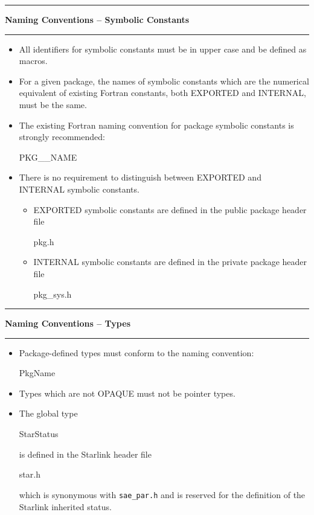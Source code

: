 \documentclass[twoside,11pt,nolof,noabs]{starlink}
\newcounter{sruleno}
\newcommand{\srule}[1]{
    \addtocounter{sruleno}{1}
    \goodbreak
    \rule{\textwidth}{0.3mm}
    \textbf{#1} \scpushright{\textbf{\thesruleno}}
    \rule{\textwidth}{0.1mm}
}
\begin{document}
\srule{Naming Conventions -- Symbolic Constants}
\begin{itemize}
\item All identifiers for symbolic constants must be in upper case and be
defined as macros.
\item For a given package, the names of symbolic constants which are the
numerical equivalent of existing Fortran constants, both EXPORTED and
INTERNAL, must be the same.
\item The existing Fortran naming convention for package symbolic constants
is strongly recommended:
\begin{terminalv}
      PKG__NAME
\end{terminalv}
\item There is no requirement to distinguish between EXPORTED and INTERNAL
symbolic constants.
\begin{itemize}
\item EXPORTED symbolic constants are defined in the public package header
file
\begin{terminalv}
      pkg.h
\end{terminalv}
\item INTERNAL symbolic constants are defined in the private package header
file
\begin{terminalv}
      pkg_sys.h
\end{terminalv}
\end{itemize}
\end{itemize}

\srule{Naming Conventions -- Types}
\begin{itemize}
\item Package-defined types must conform to the naming convention:
\begin{terminalv}
      PkgName
\end{terminalv}
\item Types which are not OPAQUE must not be pointer types.
\item The global type
\begin{terminalv}
      StarStatus
\end{terminalv}
is defined in the Starlink header file
\begin{terminalv}
      star.h
\end{terminalv}
which is synonymous with \texttt{sae\_par.h} and is reserved for the definition
of the Starlink inherited status.
\end{itemize}
\end{document}

